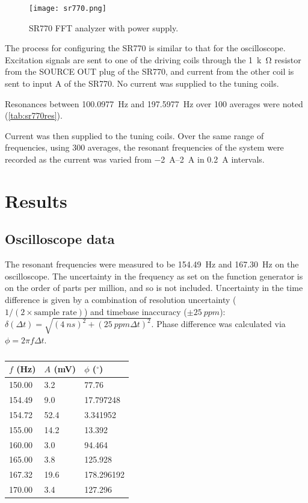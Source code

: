 \documentclass{article}
\begin{document}
\begin{figure}
  \centering
  \texttt{[image: sr770.png]}
  \caption{SR770 FFT analyzer with power supply.}
\end{figure}

The process for configuring the SR770 is similar to that for the oscilloscope. Excitation signals are sent to one of the driving coils through the \qty{1}{k\ohm} resistor from the SOURCE OUT plug of the SR770, and current from the other coil is sent to input A of the SR770. No current was supplied to the tuning coils.

Resonances between \qty{100.0977}{Hz} and \qty{197.5977}{Hz} over 100 averages were noted (\autoref{tab:sr770res}).

Current was then supplied to the tuning coils. Over the same range of frequencies, using 300 averages, the resonant frequencies of the system were recorded as the current was varied from \qtyrange{-2}{2}{\ampere} in \qty{0.2}{\ampere} intervals.

\section{Results}

\subsection{Oscilloscope data}
The resonant frequencies were measured to be \qty{154.49}{Hz} and \qty{167.30}{Hz} on the oscilloscope. The uncertainty in the frequency as set on the function generator is on the order of parts per million, and so is not included. Uncertainty in the time difference is given by a combination of resolution uncertainty ($1/(2\times\text{sample rate})$) and timebase inaccuracy ($\pm\qty{25}{ppm}$):  $\delta(\Delta t) = \sqrt{\left( \qty{4}{ns} \right)^2 + \left( \qty{25}{ppm} \Delta t \right)^2}$.
Phase difference was calculated via $\phi = 2\pi f \Delta t$.

\begin{table}
  \centering
  \begin{tabular}{@{}lll@{}}
    \toprule
    $f$ (\unit{Hz}) & $A$ (\unit{\mV}) & $\phi$ ($^\circ$) \\ \midrule
    150.00    & 3.2      & 77.76      \\
    154.49   & 9.0      & 17.797248  \\
    154.72   & 52.4     & 3.341952   \\
    155.00    & 14.2     & 13.392     \\
    160.00    & 3.0      & 94.464     \\
    165.00    & 3.8      & 125.928    \\
    167.32   & 19.6     & 178.296192 \\
    170.00    & 3.4      & 127.296    \\ \bottomrule
  \end{tabular}
  \caption{}
  \label{tab:oscfa}
\end{table}
\end{document}
